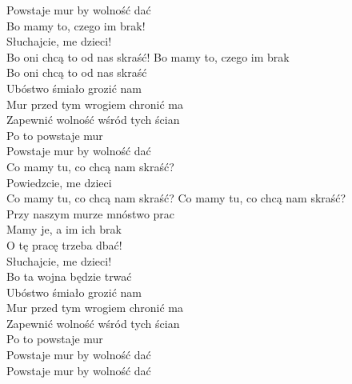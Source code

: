 \begin{flushleft}
\hspace{0.9cm}Powstaje mur by wolność dać
\vskip 3mm
\\
Bo mamy to, czego im brak!\\
Słuchajcie, me dzieci!\\
Bo oni chcą to od nas skraść!
\vskip 3mm
\hspace{0.9cm}Bo mamy to, czego im brak\\
\hspace{0.9cm}Bo oni chcą to od nas skraść\\
\hspace{0.9cm}Ubóstwo śmiało grozić nam\\
\hspace{0.9cm}Mur przed tym wrogiem chronić ma\\
\hspace{0.9cm}Zapewnić wolność wśród tych ścian\\
\hspace{0.9cm}Po to powstaje mur\\
\hspace{0.9cm}Powstaje mur by wolność dać
\vskip 3mm
\\
Co mamy tu, co chcą nam skraść?\\
Powiedzcie, me dzieci\\
Co mamy tu, co chcą nam skraść?
\vskip 3mm
\hspace{0.9cm}Co mamy tu, co chcą nam skraść?\\
\hspace{0.9cm}Przy naszym murze mnóstwo prac\\
\hspace{0.9cm}Mamy je, a im ich brak
\vskip 3mm
\\
O tę pracę trzeba dbać!\\
Słuchajcie, me dzieci!\\
Bo ta wojna będzie trwać\\
\vskip 3mm
\hspace{0.9cm}Ubóstwo śmiało grozić nam\\
\hspace{0.9cm}Mur przed tym wrogiem chronić ma\\
\hspace{0.9cm}Zapewnić wolność wśród tych ścian\\
\hspace{0.9cm}Po to powstaje mur\\
\hspace{0.9cm}Powstaje mur by wolność dać\\
\hspace{0.9cm}Powstaje mur by wolność dać
\end{flushleft}
\newpage